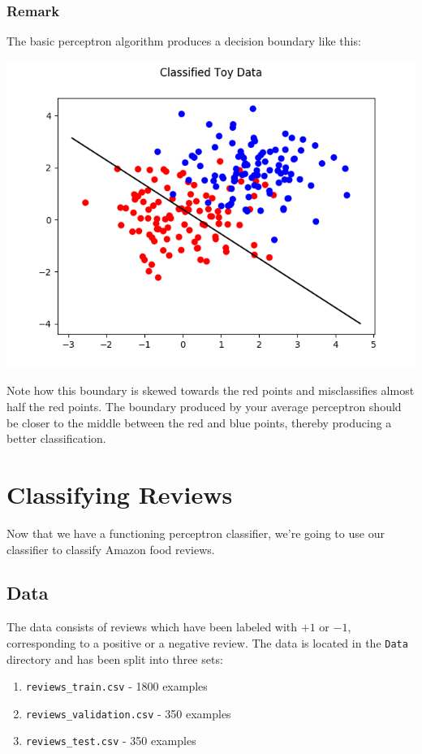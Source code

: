 \documentclass{article}
\begin{document}
\subsubsection{Remark}

The basic perceptron algorithm produces a decision boundary like this:

\noindent
\includegraphics[width=\textwidth]{perceptron.png}

Note how this boundary is skewed towards the red points and misclassifies almost half the red points. The boundary produced by your average perceptron should be closer to the middle between the red and blue points, thereby producing a better classification.

\section{Classifying Reviews}

Now that we have a functioning perceptron classifier, we're going to use our classifier to classify Amazon food reviews.

\subsection{Data}

The data consists of reviews which have been labeled with $+1$ or $-1$, corresponding to a positive or a negative review. The data is located in the \texttt{Data} directory and has been split into three sets:

\begin{enumerate}
    \item \texttt{reviews\_train.csv} - 1800 examples
    \item \texttt{reviews\_validation.csv} - 350 examples
    \item \texttt{reviews\_test.csv} - 350 examples
\end{enumerate}
\end{document}
